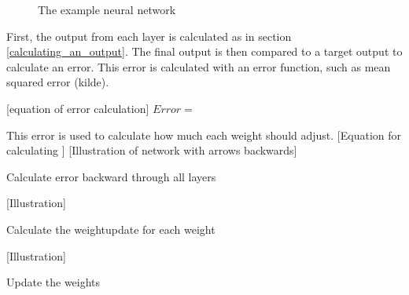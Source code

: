 \begin{figure}[H]
  \centering

    \caption{The example neural network}
    \label{fig:backprop_one}
\end{figure}

First, the output from each layer is calculated as in section \ref{calculating_an_output}. The final output is then compared to a target output to calculate an error. This error is calculated with an error function, such as mean squared error (kilde).

[equation of error calculation]
$
Error = 
$


This error is used to calculate how much each weight should adjust.
[Equation for calculating ]
[Illustration of network with arrows backwards]

Calculate error backward through all layers

[Illustration]

Calculate the weightupdate for each weight

[Illustration]

Update the weights

